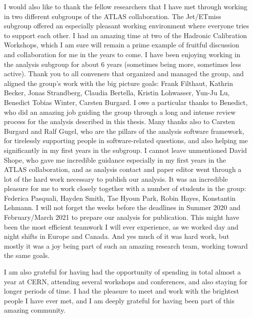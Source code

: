 I would also like to thank the fellow researchers that I have met through working in two different subgroups of the ATLAS collaboration. 
The Jet/ETmiss subgroup offered an especially pleasant working environment where everyone tries to support each other. I had an amazing time at two of the Hadronic Calibration Workshops, which I am sure will remain a prime example of fruitful discussion and collaboration for me in the years to come. 
I have been enjoying working in the \HWW analysis subgroup for about 6 years (sometimes being more, sometimes less active). Thank you to all conveners that organized and managed the group, and aligned the group's work with the big picture goals: Frank Filthaut, Kathrin Becker, Jonas Strandberg, Claudia Bertella, Kristin Lohwasser, Yun-Ju Lu, Benedict Tobias Winter, Carsten Burgard. 
I owe a particular thanks to Benedict, who did an amazing job guiding the group through a long and intense review process for the analysis described in this thesis. 
Many thanks also to Carsten Burgard and Ralf Gugel, who are the pillars of the analysis software framework, for tirelessly supporting people in software-related questions, and also helping me significantly in my first years in the \HWW subgroup. 
I cannot leave unmentioned David Shope, who gave me incredible guidance especially in my first years in the ATLAS collaboration, and as analysis contact and paper editor went through a lot of the hard work necessary to publish our analysis.
It was an incredible pleasure for me to work closely together with a number of students in the group: Federica Pasquali, Hayden Smith, Tae Hyoun Park, Robin Hayes, Konstantin Lehmann. 
I will not forget the weeks before the deadlines in Summer 2020 and February/March 2021 to prepare our analysis for publication.
This might have been the most efficient teamwork I will ever experience, as we worked day and night shifts in Europe and Canada. 
And yes much of it was hard work, but mostly it was a joy being part of such an amazing research team, working toward the same goals.

I am also grateful for having had the opportunity of spending in total almost a year at CERN, attending several workshops and conferences, and also staying for longer periods of time. 
I had the pleasure to meet and work with the brightest people I have ever met, and I am deeply grateful for having been part of this amazing community. 

